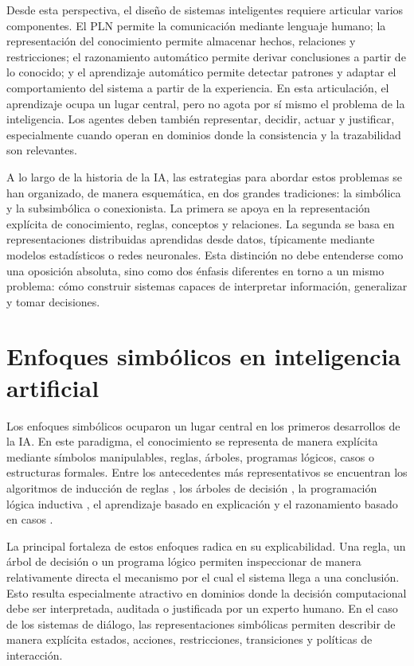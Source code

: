 Desde esta perspectiva, el diseño de sistemas inteligentes requiere articular varios
componentes. El \ac{PLN} permite la comunicación mediante lenguaje humano; la
representación del conocimiento permite almacenar hechos, relaciones y restricciones;
el razonamiento automático permite derivar conclusiones a partir de lo conocido; y el
aprendizaje automático permite detectar patrones y adaptar el comportamiento del
sistema a partir de la experiencia. En esta articulación, el aprendizaje ocupa un lugar
central, pero no agota por sí mismo el problema de la inteligencia. Los agentes deben
también representar, decidir, actuar y justificar, especialmente cuando operan en
dominios donde la consistencia y la trazabilidad son relevantes.

A lo largo de la historia de la \ac{IA}, las estrategias para abordar estos problemas se
han organizado, de manera esquemática, en dos grandes tradiciones: la simbólica y la
subsimbólica o conexionista. La primera se apoya en la representación explícita de
conocimiento, reglas, conceptos y relaciones. La segunda se basa en representaciones
distribuidas aprendidas desde datos, típicamente mediante modelos estadísticos o redes
neuronales. Esta distinción no debe entenderse como una oposición absoluta, sino como
dos énfasis diferentes en torno a un mismo problema: cómo construir sistemas capaces
de interpretar información, generalizar y tomar decisiones.

\section{Enfoques simbólicos en inteligencia artificial}

Los enfoques simbólicos ocuparon un lugar central en los primeros desarrollos de la
\ac{IA}. En este paradigma, el conocimiento se representa de manera explícita mediante
símbolos manipulables, reglas, árboles, programas lógicos, casos o estructuras formales.
Entre los antecedentes más representativos se encuentran los algoritmos de inducción
de reglas \citep{michalski1969quasi,quinlan1986induction}, los árboles de decisión
\citep{quinlan1993c45}, la programación lógica inductiva \citep{muggleton1995inverse},
el aprendizaje basado en explicación \citep{mitchell1986explanation} y el razonamiento
basado en casos \citep{kolodner1993case}.

La principal fortaleza de estos enfoques radica en su explicabilidad. Una regla, un árbol
de decisión o un programa lógico permiten inspeccionar de manera relativamente directa
el mecanismo por el cual el sistema llega a una conclusión. Esto resulta especialmente
atractivo en dominios donde la decisión computacional debe ser interpretada,
auditada o justificada por un experto humano. En el caso de los sistemas de diálogo,
las representaciones simbólicas permiten describir de manera explícita estados,
acciones, restricciones, transiciones y políticas de interacción.

